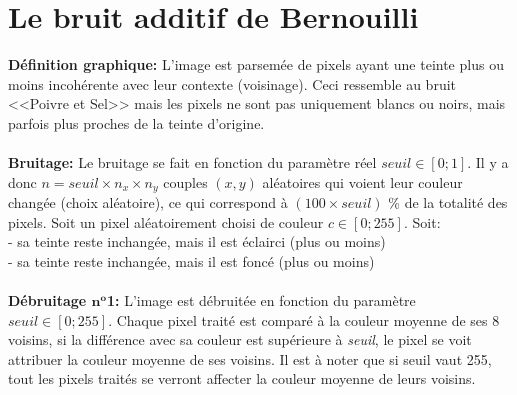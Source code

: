 \documentclass{article}
\begin{document}
	\newpage
	
	
		\section{Le bruit additif de Bernouilli}
		\textbf{Définition graphique: }L'image est parsemée de pixels ayant une teinte plus ou moins incohérente avec leur contexte (voisinage). Ceci ressemble au bruit <<Poivre et Sel>> mais les pixels ne sont pas uniquement blancs ou noirs, mais parfois plus proches de la teinte d'origine.\\\\
		\textbf{Bruitage: }Le bruitage se fait en fonction du paramètre réel \begin{math}seuil\in[0;1]\end{math}. Il y a donc \begin{math}n = seuil\times n_x\times n_y\end{math} couples \begin{math}(x, y)\end{math} aléatoires qui voient leur couleur changée (choix aléatoire), ce qui correspond à \begin{math}(100\times seuil)\end{math} \% de la totalité des pixels. Soit un pixel aléatoirement choisi de couleur \begin{math}c \in [0;255]\end{math}. Soit:\\
		- sa teinte reste inchangée, mais il est éclairci (plus ou moins)\\
		- sa teinte reste inchangée, mais il est foncé (plus ou moins)\\\\
		\textbf{Débruitage \begin{math}\textbf{n}^\textbf{o}\end{math}1: }L'image est débruitée en fonction du paramètre \begin{math}seuil \in [0;255]\end{math}. Chaque pixel traité est comparé à la couleur moyenne de ses 8 voisins, si la différence avec sa couleur est supérieure à \emph{seuil}, le pixel se voit attribuer la couleur moyenne de ses voisins. Il est à noter que si seuil vaut 255, tout les pixels traités se verront affecter la couleur moyenne de leurs voisins.\\\\
\end{document}
